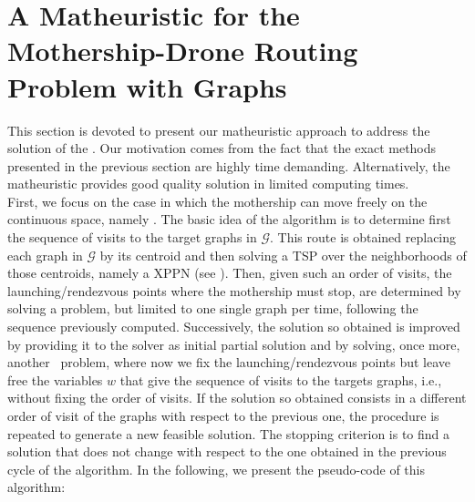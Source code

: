 \section{A Matheuristic for the Mothership-Drone Routing Problem with Graphs}\label{Math}
\noindent
This section is devoted to present our matheuristic approach to address the solution of the \MDR. Our motivation comes from the fact that the exact methods presented in the previous section are highly time demanding. Alternatively, the matheuristic provides good quality solution in limited computing times.\\
\noindent
First, we focus on the case in which the mothership can move freely on the continuous space, namely \AMD.
The basic idea of the algorithm is to determine first the sequence of visits to the target graphs in $\mathcal{G}$. This route is obtained replacing each graph in $\mathcal{G}$ by its centroid and then solving a TSP over the neighborhoods of those centroids, namely a XPPN (see \cite{art:Puerto2020}). Then, given such an order of visits, the launching/rendezvous points where the mothership must stop, are determined by solving a \AMD\xspace problem, but limited to one single graph per time, following the sequence previously computed. Successively, the solution so obtained is improved by providing it to the solver as initial partial solution and by solving, once more, another \AMD \ problem, where now we fix the launching/rendezvous points but leave free the variables $w$ that give the sequence of visits to the targets graphs, i.e., without fixing the order of visits.
If the solution so obtained consists in a different order of visit of the graphs with respect to the previous one, the procedure is repeated to generate a new feasible solution. The stopping criterion is to find a solution that does not change with respect to the one obtained in the previous cycle of the algorithm.
In the following, we present the pseudo-code of this algorithm:



